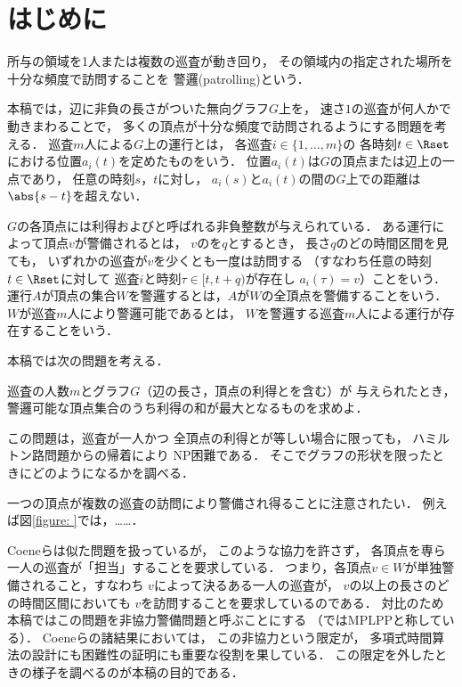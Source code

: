 
\section{はじめに}
所与の領域を1人または複数の巡査が動き回り，
その領域内の指定された場所を十分な頻度で訪問することを
警邏(patrolling)という\cite{chen2013fence, coene2011charlemagne, czyzowicz2011boundary}．


本稿では，辺に非負の長さがついた無向グラフ$G$上を，
速さ$1$の巡査が何人かで動きまわることで，
多くの頂点が十分な頻度で訪問されるようにする問題を考える．
巡査$m$人による$G$上の運行とは，
各巡査$i \in \{1, \ldots, m\}$の
各時刻$t \in \Rset$における位置$a _i (t)$を定めたものをいう．
位置$a _i (t)$は$G$の頂点または辺上の一点であり，
任意の時刻$s$，$t$に対し，
$a _i (s)$と$a _i (t)$の間の$G$上での距離は$\abs{s - t}$を超えない．


$G$の各頂点には利得および{\idletime}と呼ばれる非負整数が与えられている．
ある運行によって頂点$v$が警備されるとは，
$v$の{\idletime}を$q$とするとき，
長さ$q$のどの時間区間を見ても，
いずれかの巡査が$v$を少くとも一度は訪問する
（すなわち任意の時刻$t \in \Rset$に対して
巡査$i$と時刻$\tau \in [t, t + q)$が存在し
$a _i (\tau) = v$）ことをいう．
運行$A$が頂点の集合$W$を警邏するとは，$A$が$W$の全頂点を警備することをいう．
$W$が巡査$m$人により警邏可能であるとは，
$W$を警邏する巡査$m$人による運行が存在することをいう．

本稿では次の問題を考える．

\begin{cooperativepatrollingproblem}
	巡査の人数$m$とグラフ$G$（辺の長さ，頂点の利得と{\idletime}を含む）が
	与えられたとき，
	警邏可能な頂点集合のうち利得の和が最大となるものを求めよ．
\end{cooperativepatrollingproblem}

この問題は，巡査が一人かつ
全頂点の利得と{\idletime}が等しい場合に限っても，
ハミルトン路問題からの帰着により
NP困難である\cite[Theorem~8]{coene2011charlemagne}．
そこでグラフの形状を限ったときにどのようになるかを調べる．

一つの頂点が複数の巡査の訪問により警備され得ることに注意されたい．
例えば図\ref{figure: }では，……．

Coeneら\cite{coene2011charlemagne}は似た問題を扱っているが，
このような協力を許さず，
各頂点を専ら一人の巡査が「担当」することを要求している．
つまり，各頂点$v \in W$が単独警備されること，すなわち
$v$によって決るある一人の巡査が，
$v$の{\idletime}以上の長さのどの時間区間においても
$v$を訪問することを要求しているのである．
対比のため本稿ではこの問題を非協力警備問題と呼ぶことにする
（\cite{coene2011charlemagne}ではMPLPPと称している）．
Coeneら\cite{coene2011charlemagne}の諸結果においては，
この非協力という限定が，
多項式時間算法の設計にも困難性の証明にも重要な役割を果している．
この限定を外したときの様子を調べるのが本稿の目的である．

